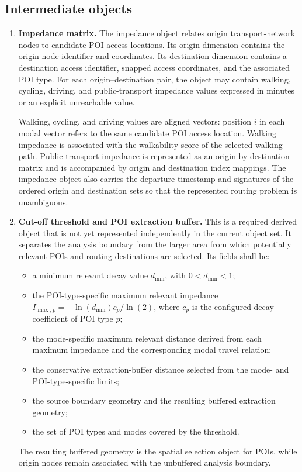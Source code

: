 \subsection*{Intermediate objects}
\begin{enumerate}
    \item \textbf{Impedance matrix.}
    The impedance object relates origin transport-network nodes to candidate POI
    access locations. Its origin dimension contains the origin node identifier
    and coordinates. Its destination dimension contains a destination access
    identifier, snapped access coordinates, and the associated POI type. For
    each origin--destination pair, the object may contain walking, cycling,
    driving, and public-transport impedance values expressed in minutes or an
    explicit unreachable value.

    Walking, cycling, and driving values are aligned vectors: position \(i\) in
    each modal vector refers to the same candidate POI access location. Walking
    impedance is associated with the walkability score of the selected walking
    path. Public-transport impedance is represented as an origin-by-destination
    matrix and is accompanied by origin and destination index mappings. The
    impedance object also carries the departure timestamp and signatures of the
    ordered origin and destination sets so that the represented routing problem
    is unambiguous.

    \item \textbf{Cut-off threshold and POI extraction buffer.}
    This is a required derived object that is not yet represented independently
    in the current object set. It separates the analysis boundary from the
    larger area from which potentially relevant POIs and routing destinations
    are selected. Its fields shall be:
    \begin{itemize}
        \item a minimum relevant decay value \(d_{\min}\), with
        \(0 < d_{\min} < 1\);
        \item the POI-type-specific maximum relevant impedance
        \(I_{\max,p}=-\ln(d_{\min})c_p/\ln(2)\), where \(c_p\) is the configured
        decay coefficient of POI type \(p\);
        \item the mode-specific maximum relevant distance derived from each
        maximum impedance and the corresponding modal travel relation;
        \item the conservative extraction-buffer distance selected from the
        mode- and POI-type-specific limits;
        \item the source boundary geometry and the resulting buffered extraction
        geometry;
        \item the set of POI types and modes covered by the threshold.
    \end{itemize}
    The resulting buffered geometry is the spatial selection object for POIs,
    while origin nodes remain associated with the unbuffered analysis boundary.


\end{enumerate}
